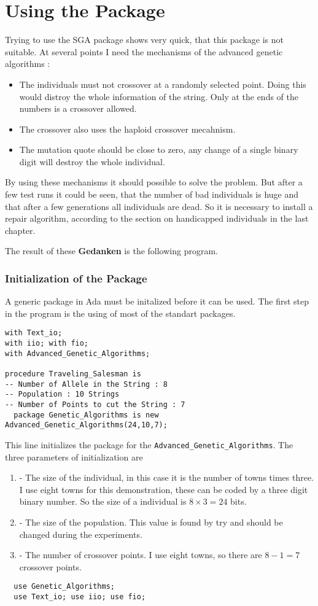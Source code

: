 \section{Using the Package}
Trying to use the SGA package shows very quick, that this package is not suitable.
At several points I need the mechanisms of the advanced genetic algorithms :
  \begin{itemize}
  \item The individuals must not crossover at a randomly selected point. Doing
  this would distroy the whole information of the string. Only at the ends of the
  numbers is a crossover allowed.
  \item The crossover also uses the haploid crossover mecahnism.
  \item The mutation quote should be close to zero, any change of a single binary digit will
  destroy the whole individual.
  \end{itemize}
By using these mechanisms it should possible to solve the problem. But after a
few test runs it could be seen, that the number of bad individuals is huge and that
after a few generations all individuals are dead. So it is necessary to install
a repair algorithm, according to the section on handicapped individuals in the
last chapter.

The result of these {\bf Gedanken} is the following program.
\subsubsection{Initialization of the Package}
A generic package in Ada must be initalized before it can be used. The first
step in the program is the using of most of the standart packages.
\begin{verbatim}
with Text_io;
with iio; with fio;
with Advanced_Genetic_Algorithms;

procedure Traveling_Salesman is
-- Number of Allele in the String : 8
-- Population : 10 Strings
-- Number of Points to cut the String : 7
  package Genetic_Algorithms is new Advanced_Genetic_Algorithms(24,10,7);
\end{verbatim}
This line initializes the package for the {\tt Advanced\_Genetic\_Algorithms}.
The three parameters of initialization are
  \begin{enumerate}
  \item - The size of the individual, in this case it is the number of towns times three.
  I use eight towns for this demonstration, these can be coded by a three digit
  binary number. So the size of a individual is $8 \times 3 = 24$ bits.
  \item - The size of the population. This value is found by try and should be
  changed during the experiments.
  \item - The number of crossover points. I use eight towns, so there are $8 - 1 = 7$
  crossover points.
  \end{enumerate}
\begin{verbatim}
  use Genetic_Algorithms;
  use Text_io; use iio; use fio;
\end{verbatim}
